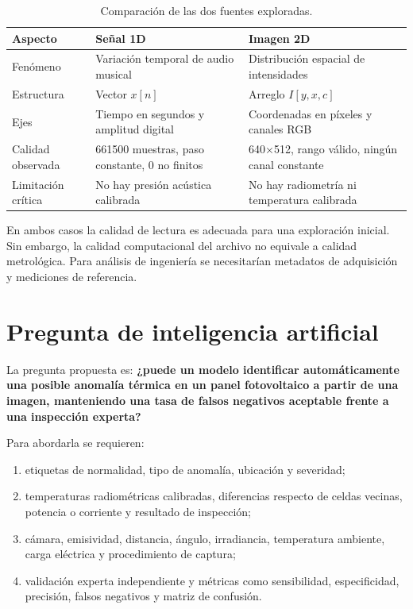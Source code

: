 \documentclass[11pt,a4paper]{article}
\begin{document}
\begin{table}[H]
\centering
\small
\begin{tabular}{p{}p{}p{}}
\toprule
\textbf{Aspecto} & \textbf{Señal 1D} & \textbf{Imagen 2D}\\
\midrule
Fenómeno & Variación temporal de audio musical & Distribución espacial de intensidades\\
Estructura & Vector \(x[n]\) & Arreglo \(I[y,x,c]\)\\
Ejes & Tiempo en segundos y amplitud digital & Coordenadas en píxeles y canales RGB\\
Calidad observada & 661500 muestras, paso constante, 0 no finitos & 640$\times$512, rango válido, ningún canal constante\\
Limitación crítica & No hay presión acústica calibrada & No hay radiometría ni temperatura calibrada\\
\bottomrule
\end{tabular}
\caption{Comparación de las dos fuentes exploradas.}
\end{table}

En ambos casos la calidad de lectura es adecuada para una exploración inicial.
Sin embargo, la calidad computacional del archivo no equivale a calidad
metrológica. Para análisis de ingeniería se necesitarían metadatos de
adquisición y mediciones de referencia.

\section{Pregunta de inteligencia artificial}

La pregunta propuesta es: \textbf{¿puede un modelo identificar automáticamente
una posible anomalía térmica en un panel fotovoltaico a partir de una imagen,
manteniendo una tasa de falsos negativos aceptable frente a una inspección
experta?}

Para abordarla se requieren:
\begin{enumerate}[leftmargin=*]
\item etiquetas de normalidad, tipo de anomalía, ubicación y severidad;
\item temperaturas radiométricas calibradas, diferencias respecto de celdas
vecinas, potencia o corriente y resultado de inspección;
\item cámara, emisividad, distancia, ángulo, irradiancia, temperatura
ambiente, carga eléctrica y procedimiento de captura;
\item validación experta independiente y métricas como sensibilidad,
especificidad, precisión, falsos negativos y matriz de confusión.
\end{enumerate}
\end{document}
